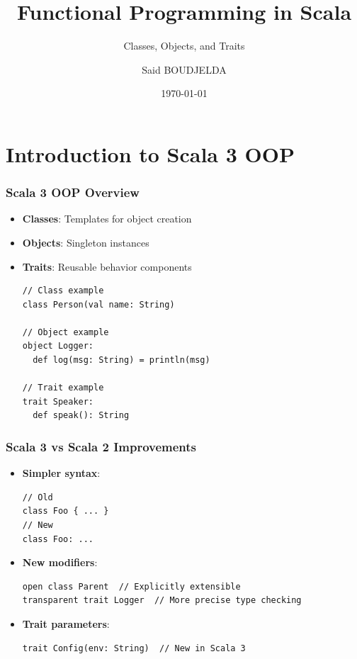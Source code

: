 \documentclass{beamer}
\title{Functional Programming in Scala}
\subtitle{Classes, Objects, and Traits}
\author{Said BOUDJELDA}
\institute{Eferi}
\date{\today}
\begin{document}
\frame{\titlepage}

\section{Introduction to Scala 3 OOP}
\begin{frame}[fragile]
\frametitle{Scala 3 OOP Overview}
\begin{itemize}
\item \textbf{Classes}: Templates for object creation
\item \textbf{Objects}: Singleton instances
\item \textbf{Traits}: Reusable behavior components

\begin{lstlisting}[style=scala]
// Class example
class Person(val name: String)

// Object example
object Logger:
  def log(msg: String) = println(msg)

// Trait example
trait Speaker:
  def speak(): String
\end{lstlisting}
\end{itemize}
\end{frame}

\begin{frame}[fragile]
\frametitle{Scala 3 vs Scala 2 Improvements}
\begin{itemize}
\item \textbf{Simpler syntax}:
\begin{lstlisting}[style=scala]
// Old
class Foo { ... }
// New
class Foo: ...
\end{lstlisting}

\item \textbf{New modifiers}:
\begin{lstlisting}[style=scala]
open class Parent  // Explicitly extensible
transparent trait Logger  // More precise type checking
\end{lstlisting}

\item \textbf{Trait parameters}:
\begin{lstlisting}[style=scala]
trait Config(env: String)  // New in Scala 3
\end{lstlisting}
\end{itemize}
\end{frame}
\end{document}
